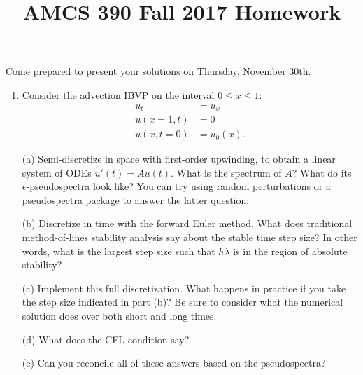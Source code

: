\documentclass[12pt]{article}
\title{AMCS 390 Fall 2017 Homework}
\begin{document}
\date{}
\maketitle

Come prepared to present your solutions on Thursday, November 30th.

\begin{enumerate}

    \item Consider the advection IBVP on the interval $0\le x \le 1$:
        \begin{align*}
            u_t & = u_x \\
            u(x=1,t) & = 0 \\
            u(x,t=0) & = u_0(x).
        \end{align*}

        (a) Semi-discretize in space with first-order upwinding, to obtain a linear
            system of ODEs $u'(t) = Au(t)$.  What is the spectrum of $A$?  What do
            its $\epsilon$-pseudospectra look like?  You can try using random
            perturbations or a pseudospectra package to answer the latter question.
        
        (b) Discretize in time with the forward Euler method.  What does traditional
            method-of-lines stability analysis say about the stable time step size?
            In other words, what is the largest step size such that $h\lambda$ is
            in the region of absolute stability?

        (c) Implement this full discretization.  What happens in practice if
            you take the step size indicated in part (b)?  Be sure to consider what
            the numerical solution does over both short and long times.

        (d) What does the CFL condition say?

        (e) Can you reconcile all of these answers based on the pseudospectra?

\end{enumerate}
\end{document}
